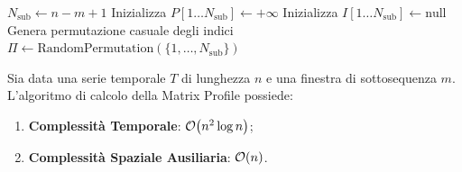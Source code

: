 \begin{algorithm}[H]
\caption{Calcolo Esatto della Matrix Profile mediante Algoritmo STAMP}
\label{algo:matrix-profile-stamp}

$N_{\text{sub}} \leftarrow n - m + 1$\;
Inizializza $P[1 \dots N_{\text{sub}}] \leftarrow +\infty$\;
Inizializza $I[1 \dots N_{\text{sub}}] \leftarrow \text{null}$\;
Genera permutazione casuale degli indici $\Pi \leftarrow \text{RandomPermutation}(\{1, \dots, N_{\text{sub}}\})$\;

\;
\end{algorithm}

\begin{theorem}
\label{thm:mp-complexity}
Sia data una serie temporale $T$ di lunghezza $n$ e una finestra di sottosequenza $m$. L'algoritmo di calcolo della Matrix Profile possiede:
\begin{enumerate}
    \item \textbf{Complessit\`a Temporale}: $\mathcal{O}\!\left(n^2 \log n\right)$;
    \item \textbf{Complessit\`a Spaziale Ausiliaria}: $\mathcal{O}\!\left(n\right)$.
\end{enumerate}
\end{theorem}


